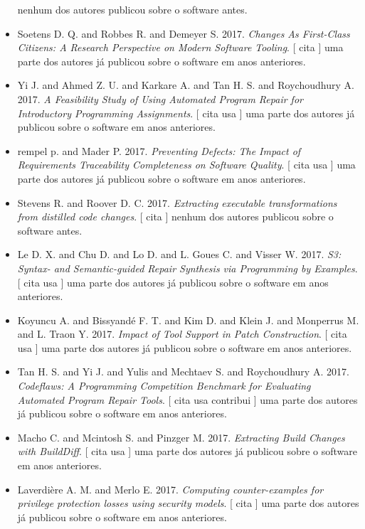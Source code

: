 \begin{itemize}
nenhum dos autores publicou sobre o software antes.
\item Soetens D. Q. and Robbes R. and Demeyer S.
      2017.
        \textit{ Changes As First-Class Citizens: A Research Perspective on Modern Software Tooling}.
      [
          cita
      ]
uma parte dos autores já publicou sobre o software em anos anteriores.
\item Yi J. and Ahmed Z. U. and Karkare A. and Tan H. S. and Roychoudhury A.
      2017.
        \textit{ A Feasibility Study of Using Automated Program Repair for Introductory Programming Assignments}.
      [
          cita
          usa
      ]
uma parte dos autores já publicou sobre o software em anos anteriores.
\item rempel p. and Mader P.
      2017.
        \textit{ Preventing Defects: The Impact of Requirements Traceability Completeness on Software Quality}.
      [
          cita
          usa
      ]
uma parte dos autores já publicou sobre o software em anos anteriores.
\item Stevens R. and Roover D. C.
      2017.
        \textit{ Extracting executable transformations from distilled code changes}.
      [
          cita
      ]
nenhum dos autores publicou sobre o software antes.
\item Le D. X. and Chu D. and Lo D. and L. Goues C. and Visser W.
      2017.
        \textit{ S3: Syntax- and Semantic-guided Repair Synthesis via Programming by Examples}.
      [
          cita
          usa
      ]
uma parte dos autores já publicou sobre o software em anos anteriores.
\item Koyuncu A. and Bissyand{\'e} F. T. and Kim D. and Klein J. and Monperrus M. and L. Traon Y.
      2017.
        \textit{ Impact of Tool Support in Patch Construction}.
      [
          cita
          usa
      ]
uma parte dos autores já publicou sobre o software em anos anteriores.
\item Tan H. S. and Yi J. and Yulis and Mechtaev S. and Roychoudhury A.
      2017.
        \textit{ Codeflaws: A Programming Competition Benchmark for Evaluating Automated Program Repair Tools}.
      [
          cita
          usa
          contribui
      ]
uma parte dos autores já publicou sobre o software em anos anteriores.
\item Macho C. and Mcintosh S. and Pinzger M.
      2017.
        \textit{ Extracting Build Changes with BuildDiff}.
      [
          cita
          usa
      ]
uma parte dos autores já publicou sobre o software em anos anteriores.
\item Laverdière A. M. and Merlo E.
      2017.
        \textit{ Computing counter-examples for privilege protection losses using security models}.
      [
          cita
      ]
uma parte dos autores já publicou sobre o software em anos anteriores.
\end{itemize}
